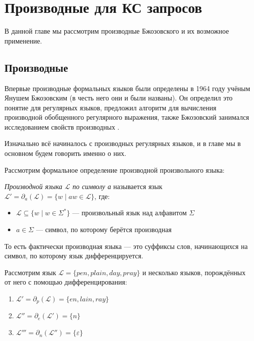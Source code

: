 \chapter{Производные для КС запросов}\label{chpt:CFPQ_Derivatives}

В данной главе мы рассмотрим производные Бжозовского и их возможное применение.

\section{Производные}

Впервые производные формальных языков были определены в 1964 году учёным Янушем Бжозовским (в честь него они и были названы). Он определил это понятие для регулярных языков, предложил алгоритм для вычисления производной обобщенного регулярного выражения, также Бжозовский занимался исследованием свойств производных {\cite{Brzozowski1964}}. 

Изначально всё начиналось с производных регулярных языков, и в главе мы в основном будем говорить именно о них.

Рассмотрим формальное определение производной произвольного языка:

\begin{definition}
    \textit{Производной языка $\mathcal{L}$ по символу а} называется язык $\mathcal{L'} = \partial_{a}(\mathcal{L}) = \{w \mid aw \in \mathcal{L}\}$, где:
    \begin{itemize}
        \item $\mathcal{L} \subseteq \{w \mid w \in \Sigma^*\}$ --- произвольный язык над алфавитом $\Sigma$
        \item $a \in \Sigma$ --- символ, по которому берётся производная
    \end{itemize}
    То есть фактически производная языка --- это суффиксы слов, начинающихся на символ, по которому язык дифференцируется.
\end{definition}

\begin{example}
Рассмотрим язык $\mathcal{L} = \{pen, plain, day, pray\}$ и несколько языков, порождённых от него с помощью дифференцирования: 
\begin{enumerate}
    \item $\mathcal{L'} = \partial_{p}(\mathcal{L}) = \{en, lain, ray\}$
    \item $\mathcal{L''} = \partial_{e}(\mathcal{L'}) = \{n\}$
    \item $\mathcal{L'''} =\partial_{n}(\mathcal{L''}) = \{\varepsilon\}$
\end{enumerate}
\end{example}

